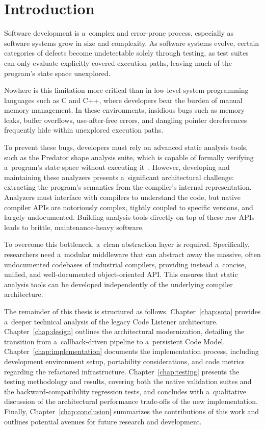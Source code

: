 \documentclass[xpsejal00-gcc-plugin.tex]{subfiles}
\begin{document}
\chapter{Introduction}\label{chap:introduction}

Software development is a~complex and error-prone process, especially as software systems grow in size and complexity.
As software systems evolve, certain categories of defects become undetectable solely through testing, as test suites can only evaluate explicitly covered execution paths, leaving much of the program's state space unexplored.

Nowhere is this limitation more critical than in low-level system programming languages such as C and C++, where developers bear the burden of manual memory management.
In these environments, insidious bugs such as memory leaks, buffer overflows, use-after-free errors, and dangling pointer dereferences frequently hide within unexplored execution paths.

To prevent these bugs, developers must rely on advanced static analysis tools, such as the Predator shape analysis suite, which is capable of formally verifying a~program's state space without executing it~\cite{PredatorSuite2016}.
However, developing and maintaining these analyzers presents a~significant architectural challenge: extracting the program's semantics from the compiler's internal representation.
Analyzers must interface with compilers to understand the code, but native compiler APIs are notoriously complex, tightly coupled to specific versions, and largely undocumented.
Building analysis tools directly on top of these raw APIs leads to brittle, maintenance-heavy software.

To overcome this bottleneck, a~clean abstraction layer is required.
Specifically, researchers need a~modular middleware that can abstract away the massive, often undocumented codebases of industrial compilers, providing instead a~concise, unified, and well-documented object-oriented API.\@
This ensures that static analysis tools can be developed independently of the underlying compiler architecture.

The remainder of this thesis is structured as follows.
Chapter~\ref{chap:sota} provides a~deeper technical analysis of the legacy Code Listener architecture.
Chapter~\ref{chap:design} outlines the architectural modernization, detailing the transition from a~callback-driven pipeline to a~persistent Code Model.
Chapter~\ref{chap:implementation} documents the implementation process, including development environment setup, portability considerations, and code metrics regarding the refactored infrastructure.
Chapter~\ref{chap:testing} presents the testing methodology and results, covering both the native validation suites and the backward-compatibility regression tests, and concludes with a~qualitative discussion of the architectural performance trade-offs of the new implementation.
Finally, Chapter~\ref{chap:conclusion} summarizes the contributions of this work and outlines potential avenues for future research and development.
\end{document}
